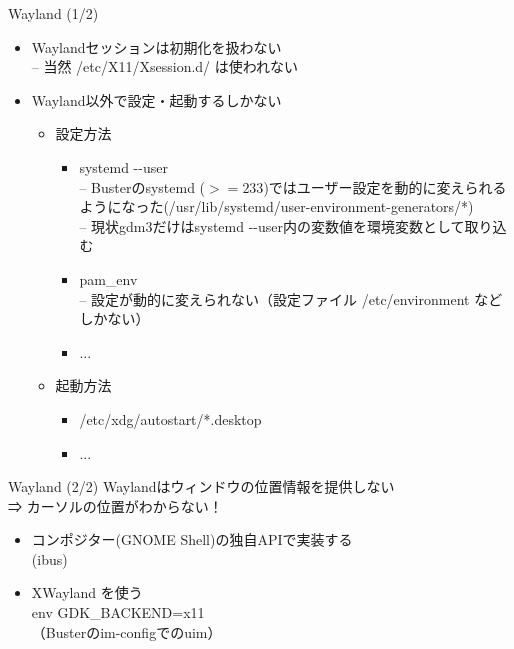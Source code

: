 \begin{frame}{Wayland (1/2)}

\begin{itemize}[<+->]
 \item Waylandセッションは初期化を扱わない\\
 -- 当然 /etc/X11/Xsession.d/ は使われない
 \item Wayland以外で設定・起動するしかない

\begin{itemize}
 \item 設定方法
\begin{itemize}
 \item systemd -{}-user\\
-- Busterのsystemd ($>= 233$)ではユーザー設定を動的に変えられるようになった(/usr/lib/systemd/user-environment-generators/*)\\
-- 現状gdm3だけはsystemd -{}-user内の変数値を環境変数として取り込む
 \item pam\_env\\
-- 設定が動的に変えられない（設定ファイル /etc/environment などしかない）
 \item ...
\end{itemize}

 \item 起動方法
\begin{itemize}
 \item /etc/xdg/autostart/*.desktop
 \item ...
\end{itemize}

\end{itemize}

\end{itemize}

\end{frame}

\begin{frame}{Wayland (2/2)}
Waylandはウィンドウの位置情報を提供しない\\
\pause
⇒ カーソルの位置がわからない！
\pause
\begin{itemize}
 \item コンポジター(GNOME Shell)の独自APIで実装する\\
(ibus)
\pause
 \item XWayland を使う\\
env GDK\_BACKEND=x11\\
（Busterのim-configでのuim）
\end{itemize}

\end{frame}

